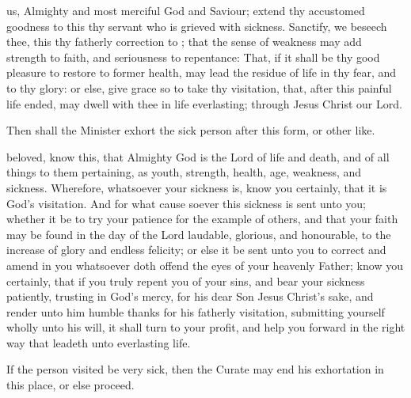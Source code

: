  us, Almighty and most merciful God and Saviour; extend thy accustomed goodness to this thy servant who is grieved with sickness.
Sanctify, we beseech thee, this thy fatherly correction to ; that the sense of  weakness may add strength to  faith, and seriousness to  repentance:
That, if it shall be thy good pleasure to restore  to  former health,  may lead the residue of  life in thy fear, and to thy glory:
or else, give  grace so to take thy visitation, that, after this painful life ended,  may dwell with thee in life everlasting; through Jesus Christ our Lord.

\begin{rubric}
Then shall the Minister exhort the sick person after this form, or other like.
\end{rubric}

 beloved, know this, that Almighty God is the Lord of life and death, and of all things to them pertaining, as youth, strength, health, age, weakness, and sickness.
Wherefore, whatsoever your sickness is, know you certainly, that it is God's visitation. And for what cause soever this sickness is sent unto you; whether it be to try your patience for the example of others, and that your faith may be found in the day of the Lord laudable, glorious, and honourable, to the increase of glory and endless felicity;
or else it be sent unto you to correct and amend in you whatsoever doth offend the eyes of your heavenly Father; know you certainly, that if you truly repent you of your sins, and bear your sickness patiently, trusting in God's mercy, for his dear Son Jesus Christ's sake, and render unto him humble thanks for his fatherly visitation, submitting yourself wholly unto his will, it shall turn to your profit, and help you forward in the right way that leadeth unto everlasting life.

\newpage

\begin{rubric}
If the person visited be very sick, then the Curate may end his exhortation in this place, or else proceed.
\end{rubric}

